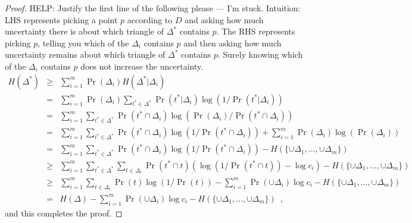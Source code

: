 \documentclass[lotsofwhite]{patmorin}
\begin{document}
\begin{proof}
HELP: Justify the first line of the following please --- I'm stuck.
Intuition: LHS represents picking a point $p$ according to $D$ and
asking how much uncertainty there is about which triangle of
$\Delta^*$ contains $p$.  The RHS represents picking $p$, telling you
which of the $\Delta_i$ contains $p$ and then asking how much
uncertainty remains about which triangle of $\Delta^*$ contains $p$.
Surely knowing which of the $\Delta_i$ contains $p$ does not increase
the uncertainty.
\begin{eqnarray*}
   H(\Delta^*) 
     & \ge & \sum_{i=1}^m \Pr(\Delta_i)H(\Delta^*|\Delta_i) \\
     &  =  & \sum_{i=1}^m \Pr(\Delta_i)\sum_{t^*\in\Delta^*}
       \Pr(t^*|\Delta_i)\log(1/\Pr(t^*|\Delta_i)) \\
     &  =  & \sum_{i=1}^m \sum_{t^*\in\Delta^*}
       \Pr(t^*\cap\Delta_i)\log(\Pr(\Delta_i)/\Pr(t^*\cap\Delta_i)) \\
     &  =  & \sum_{i=1}^m \sum_{t^*\in\Delta^*}
       \Pr(t^*\cap\Delta_i)\log(1/\Pr(t^*\cap\Delta_i)) 
        + \sum_{i=1}^m \Pr(\Delta_i)\log(\Pr(\Delta_i)) \\
     &  =  & \sum_{i=1}^m \sum_{t^*\in\Delta^*}
       \Pr(t^*\cap\Delta_i)\log(1/\Pr(t^*\cap\Delta_i)) 
        - H(\{\cup\Delta_1,\ldots,\cup\Delta_m\}) \\
     & \ge  & \sum_{i=1}^m \sum_{t^*\in\Delta^*}\sum_{t\in\Delta_i}
       \Pr(t^*\cap t)
          \left(
            \log(1/\Pr(t^*\cap t)) -\log c_i 
          \right)- H(\{\cup\Delta_1,\ldots,\cup\Delta_m\}) \\
     & \ge  & \sum_{i=1}^m \sum_{t\in\Delta_i}
       \Pr(t)\log(1/\Pr(t)) 
        -\sum_{i=1}^m \Pr(\cup\Delta_i)\log c_i - H(\{\cup\Delta_1,\ldots,\cup\Delta_m\}) \\
     &  =  & H(\Delta) -\sum_{i=1}^m \Pr(\cup\Delta_i)\log c_i - H(\{\cup\Delta_1,\ldots,\cup\Delta_m\}) 
            \enspace ,
\end{eqnarray*}
and this completes the proof.
\end{proof}
\end{document}

